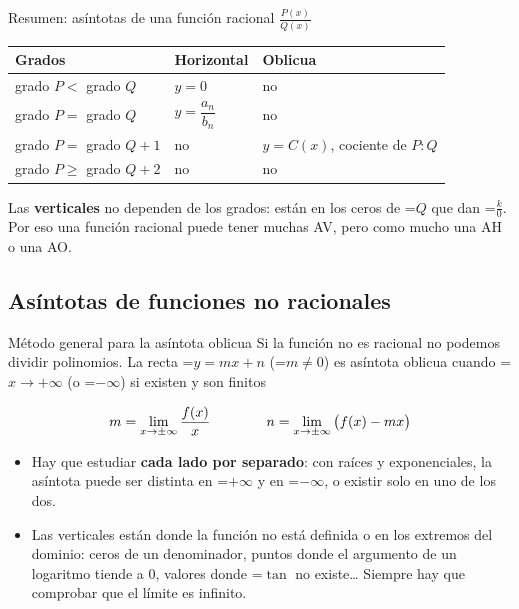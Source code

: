 \documentclass[11pt,a4paper]{article}
\newcommand{\lt}{<}\newcommand{\gt}{>}
\newcommand{\fmm}[1]{\setbox0=\hbox{$#1$}\ifdim\wd0>\linewidth\fmdisp{#1}\else\mbox{\box0}\fi}
\newcommand{\fmdisp}[1]{\[\setbox2=\hbox{$\displaystyle #1$}\ifdim\wd2>\linewidth\resizebox{\linewidth}{!}{\box2}\else\box2\fi\]}
\begin{document}
\begin{fmprop}{Resumen: asíntotas de una función racional $\frac{P(x)}{Q(x)}$}
\begin{center}\renewcommand{\arraystretch}{1.5}\small\begin{tabularx}{\linewidth}{>{\raggedright\arraybackslash}p{5.2cm}>{\raggedright\arraybackslash}X>{\raggedright\arraybackslash}X}\toprule
\textbf{Grados} & \textbf{Horizontal} & \textbf{Oblicua}\\\midrule
grado $P\lt$ grado $Q$ & $y=0$ & no\\[3pt]
grado $P=$ grado $Q$ & $y=\dfrac{a_n}{b_n}$ & no\\[3pt]
grado $P=$ grado $Q+1$ & no & $y=C(x)$, cociente de $P:Q$\\[3pt]
grado $P\geq$ grado $Q+2$ & no & no\\[3pt]
\bottomrule\end{tabularx}\end{center}

\begin{fmnote}Las \textbf{verticales} no dependen de los grados: están en los ceros de \fmm{Q} que dan \fmm{\frac k0}. Por eso una función racional puede tener muchas AV, pero como mucho una AH o una AO.\end{fmnote}
\end{fmprop}

\subsection*{Asíntotas de funciones no racionales}

\begin{fmdef}{Método general para la asíntota oblicua}
Si la función no es racional no podemos dividir polinomios. La recta \fmm{y=mx+n} (\fmm{m\neq0}) es asíntota oblicua cuando \fmm{x\to+\infty} (o \fmm{-\infty}) si existen y son finitos

\fmdisp{m=\lim_{x\to\pm\infty}\frac{f(x)}{x}\qquad\qquad n=\lim_{x\to\pm\infty}\big(f(x)-mx\big)}

\begin{itemize}
\item Hay que estudiar \textbf{cada lado por separado}: con raíces y exponenciales, la asíntota puede ser distinta en \fmm{+\infty} y en \fmm{-\infty}, o existir solo en uno de los dos.
\item Las verticales están donde la función no está definida o en los extremos del dominio: ceros de un denominador, puntos donde el argumento de un logaritmo tiende a 0, valores donde \fmm{\tan} no existe\dots{} Siempre hay que comprobar que el límite es infinito.
\end{itemize}
\end{fmdef}
\end{document}
